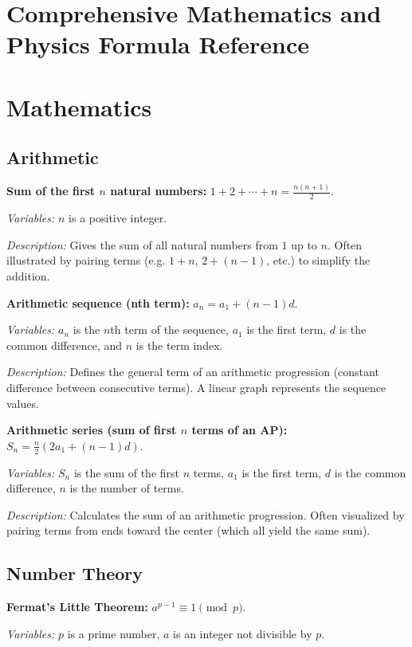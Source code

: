 \documentclass{article}
\begin{document}
\section*{Comprehensive Mathematics and Physics Formula Reference}

\section*{Mathematics}

\subsection*{Arithmetic}

\textbf{Sum of the first $n$ natural numbers:} $1 + 2 + \cdots + n = \frac{n(n+1)}{2}$.

\textit{Variables:} $n$ is a positive integer.

\textit{Description:} Gives the sum of all natural numbers from $1$ up to $n$. Often illustrated by pairing terms (e.g. $1+n$, $2+(n-1)$, etc.) to simplify the addition.

\textbf{Arithmetic sequence (nth term):} $a_n = a_1 + (n-1)d$.

\textit{Variables:} $a_n$ is the $n$th term of the sequence, $a_1$ is the first term, $d$ is the common difference, and $n$ is the term index.

\textit{Description:} Defines the general term of an arithmetic progression (constant difference between consecutive terms). A linear graph represents the sequence values.

\textbf{Arithmetic series (sum of first $n$ terms of an AP):} $S_n = \frac{n}{2}(2a_1 + (n-1)d)$.

\textit{Variables:} $S_n$ is the sum of the first $n$ terms, $a_1$ is the first term, $d$ is the common difference, $n$ is the number of terms.

\textit{Description:} Calculates the sum of an arithmetic progression. Often visualized by pairing terms from ends toward the center (which all yield the same sum).

\subsection*{Number Theory}

\textbf{Fermat's Little Theorem:} $a^{p-1} \equiv 1 \pmod p$.

\textit{Variables:} $p$ is a prime number, $a$ is an integer not divisible by $p$.
\end{document}
